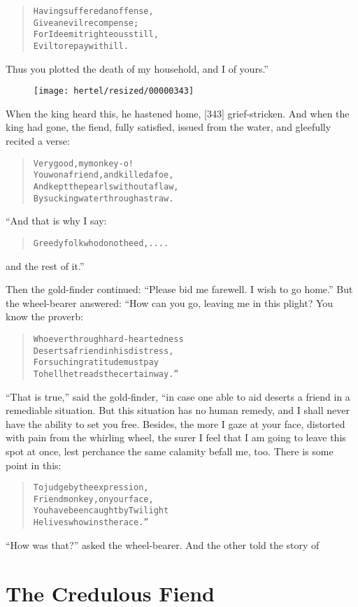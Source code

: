 \documentclass[article, twoside, 10pt]{memoir}
\renewenvironment{verbatim}{%
\begin{quote}%
\vskip -10pt%
\begin{alltt}\normalfont\small}{\end{alltt}%
\end{quote}%
\vskip -10pt
} %
\begin{document}
\begin{verbatim}
Having suffered an offense,
Give an evil recompense;
For I deem it righteous still,
Evil to repay with ill.
\end{verbatim}
Thus you plotted the death of my household, and I of yours.”

\begin{figure}[p]\texttt{[image: hertel/resized/00000343]}\end{figure}When the king heard this, he hastened home, [343] grief-stricken.
And when the king had gone, the fiend, fully satisfied, issued from
the water, and gleefully recited a verse:

\begin{verbatim}
Very good, my monkey-o!
You won a friend, and killed a foe,
And kept the pearls without a flaw,
By sucking water through a straw.
\end{verbatim}
“And that is why I say:

\begin{verbatim}
Greedy folk who do not heed, ....
\end{verbatim}
and the rest of it.”

Then the gold-finder continued:
``Please bid me farewell. I wish to go home.'' But the wheel-bearer
answered: “How can you go, leaving me in this plight? You know the
proverb:

\begin{verbatim}
Whoever through hard-heartedness
Deserts a friend in his distress,
For such ingratitude must pay{\textemdash}
To hell he treads the certain way.”
\end{verbatim}
``That is true,'' said the gold-finder, “in case one able to aid
deserts a friend in a remediable situation. But this situation has
no human remedy, and I shall never have the ability to set you
free. Besides, the more I gaze at your face, distorted with pain
from the whirling wheel, the surer I feel that I am going to leave
this spot at once, lest perchance the same calamity befall me, too.
There is some point in this:

\begin{verbatim}
To judge by the expression,
    Friend monkey, on your face,
You have been caught by Twilight{\textemdash}
    He lives who wins the race.”
\end{verbatim}
``How was that?'' asked the wheel-bearer. And the other told the
story of

\chapter{The Credulous Fiend}
\end{document}
